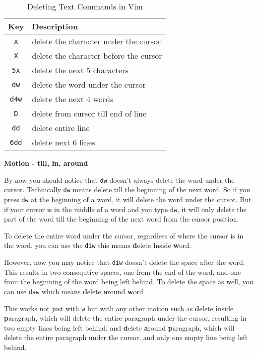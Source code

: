 \begin{table}[h!]
  \caption{Deleting Text Commands in Vim}
  \begin{tabular}{c l}
    \toprule
    Key & Description \\
    \midrule
    \texttt{x} & delete the character under the cursor \\
    \texttt{X} & delete the character before the cursor \\
    \texttt{5x} & delete the next 5 characters \\
    \texttt{dw} & delete the word under the cursor \\
    \texttt{d4w} & delete the next 4 words \\
    \texttt{D} & delete from cursor till end of line \\
    \texttt{dd} & delete entire line \\
    \texttt{6dd} & delete next 6 lines \\
    \bottomrule
  \end{tabular}
\end{table}

\textbf{Motion - till, in, around}

By now you should notice that \texttt{dw} doesn't always
delete the word under the cursor. Technically \texttt{dw}
means delete till the beginning of the next word.
So if you press \texttt{dw} at the beginning of a word,
it will delete the word under the cursor. But if your
cursor is in the middle of a word and you type \texttt{dw},
it will only delete the part of the word till the beginning
of the next word from the cursor position.

To delete the entire word under the cursor, regardless of
where the cursor is in the word, you can use the \texttt{diw}
this means \textbf{d}elete \textbf{i}nside \textbf{w}ord.

However, now you may notice that \texttt{diw} doesn't delete
the space after the word. This results in two consequtive spaces,
one from the end of the word, and one from the beginning of the
word being left behind. To delete the space as well, you can use
\texttt{daw} which means \textbf{d}elete \textbf{a}round \textbf{w}ord.

This works not just with \texttt{w} but with any other motion
such as \textbf{d}elete \textbf{i}nside \textbf{p}aragraph,
which will delete the entire paragraph under the cursor,
resulting in two empty lines being left behind,
and \textbf{d}elete \textbf{a}round \textbf{p}aragraph,
which will delete the entire paragraph under the cursor,
and only one empty line being left behind.


